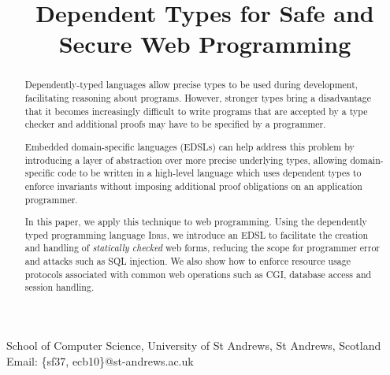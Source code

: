 \documentclass[preprint]{sigplanconf}
\begin{document}
\newcommand{\idris}{\textsc{Idris}}
\newcommand{\idata}{\textsf{iData}}
\newcommand{\itasks}{\textsf{iTasks}}
\newcommand{\Idris}{\textsc{Idris}}
\setlength{\pdfpageheight}{\paperheight}
\setlength{\pdfpagewidth}{\paperwidth}





\titlebanner{}        %
\preprintfooter{}   %

\title{Dependent Types for Safe and Secure Web Programming}
           {School of Computer Science, University of St Andrews, St Andrews, Scotland}
           {Email: \{sf37, ecb10\}@st-andrews.ac.uk}

\maketitle

\begin{abstract}
Dependently-typed languages allow precise types to be used during development,
facilitating reasoning about programs. However,
stronger types bring a disadvantage that it becomes increasingly difficult to
write programs that are accepted by a type checker and additional proofs may
have to be specified by a programmer.

Embedded domain-specific languages (EDSLs) can help address this problem by
introducing a layer of abstraction over more precise underlying types,
allowing domain-specific code to be written in a high-level language which uses
dependent types to enforce invariants without imposing additional proof
obligations on an application programmer. 

In this paper, we apply this technique to web programming.  Using the
dependently typed programming language \Idris{}, we introduce an EDSL to
facilitate the creation and handling of \emph{statically checked} web forms,
reducing the scope for programmer error and attacks such as SQL injection. We
also show how to enforce resource usage protocols associated with common web
operations such as CGI, database access and session handling.  

\end{abstract}
\end{document}
